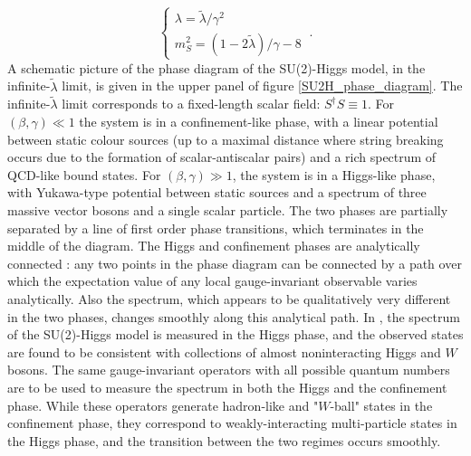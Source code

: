 \begin{equation}
\begin{cases}
\lambda = \tilde \lambda/\gamma^2\\
m_S^2 = (1-2\tilde\lambda)/\gamma - 8 
\end{cases} \: .
\end{equation}
%
A schematic picture of the phase diagram of the SU(2)-Higgs model, in the infinite-$\tilde \lambda$ limit, is given in the upper panel of figure \ref{SU2H_phase_diagram}. The infinite-$\tilde \lambda$ limit corresponds to a fixed-length scalar field: $S^{\dagger} S \equiv 1$. For $(\beta,\gamma) \ll 1$ the system is in a confinement-like phase, with a linear potential between static colour sources (up to a maximal distance where string breaking occurs due to the formation of scalar-antiscalar pairs) and a rich spectrum of QCD-like bound states. For $(\beta,\gamma) \gg 1$, the system is in a Higgs-like phase, with Yukawa-type potential between static sources and a spectrum of three massive vector bosons and a single scalar particle. The two phases are partially separated by a line of first order phase transitions, which terminates in the middle of the diagram. The Higgs and confinement phases are analytically connected \cite{Fradkin:1978dv,OSTERWALDER1978440}: any two points in the phase diagram can be connected by a path over which the expectation value of any local gauge-invariant observable varies analytically. Also the spectrum, which appears to be qualitatively very different in the two phases, changes smoothly along this analytical path. In \cite{Wurtz:2013ova}, the spectrum of the SU(2)-Higgs model is measured in the Higgs phase, and the observed states are found to be consistent with collections of almost noninteracting Higgs and $W$ bosons. The same gauge-invariant operators with all possible quantum numbers are to be used to measure the spectrum in both the Higgs and the confinement phase. While these operators generate hadron-like and "$W$-ball" states in the confinement phase, they correspond to weakly-interacting multi-particle states in the Higgs phase, and the transition between the two regimes occurs smoothly. 


